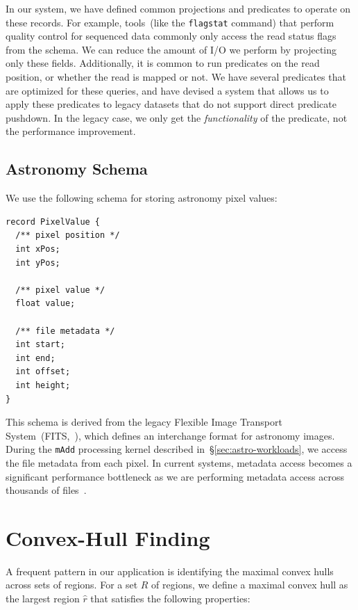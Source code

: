 \documentclass{acm_proc_article-sp}
\begin{document}
In our system, we have defined common projections and predicates to operate on these records. For
example, \linebreak tools~(like the \texttt{flagstat} command) that perform quality control for sequenced data
commonly only access the read status flags from the schema. We can reduce the amount of I/O we
perform by projecting only these fields. Additionally, it is common to run predicates on the read position,
or whether the read is mapped or not. We have several predicates that are optimized for these queries,
and have devised a system that allows us to apply these predicates to legacy datasets that do not support
direct predicate pushdown. In the legacy case, we only get the \emph{functionality} of the predicate, not the
performance improvement.

\subsection{Astronomy Schema}
\label{sec:astronomy-schema}

We use the following schema for storing astronomy pixel values:

\begin{lstlisting}
record PixelValue {
  /** pixel position */
  int xPos;
  int yPos;
  
  /** pixel value */
  float value;
  
  /** file metadata */
  int start;
  int end;
  int offset;
  int height;
}
\end{lstlisting}

This schema is derived from the legacy Flexible Image Transport System~(FITS,~\cite{wells81}), which
defines an interchange format for astronomy images. During the \texttt{mAdd} processing kernel
described in~\S\ref{sec:astro-workloads}, we access the file metadata from each pixel. In current systems,
metadata access becomes a significant performance bottleneck as we are performing metadata access
across thousands of files~\cite{zhang13}.

\section{Convex-Hull Finding}
\label{sec:convex-hull}

A frequent pattern in our application is identifying the maximal convex hulls across sets of regions. For
a set $R$ of regions, we define a maximal convex hull as the largest region $\hat{r}$ that satisfies the
following properties:
\end{document}
